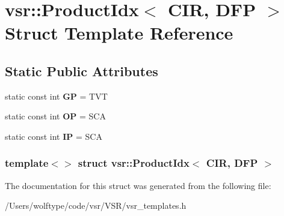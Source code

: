 \hypertarget{structvsr_1_1_product_idx_3_01_c_i_r_00_01_d_f_p_01_4}{\section{vsr\-:\-:Product\-Idx$<$ C\-I\-R, D\-F\-P $>$ Struct Template Reference}
\label{structvsr_1_1_product_idx_3_01_c_i_r_00_01_d_f_p_01_4}
}
\subsection*{Static Public Attributes}
\begin{DoxyCompactItemize}
\item 
\hypertarget{structvsr_1_1_product_idx_3_01_c_i_r_00_01_d_f_p_01_4_a2e07a5942a1a0d85abb5130ad4cd45ea}{static const int {\bfseries G\-P} = T\-V\-T}\label{structvsr_1_1_product_idx_3_01_c_i_r_00_01_d_f_p_01_4_a2e07a5942a1a0d85abb5130ad4cd45ea}

\item 
\hypertarget{structvsr_1_1_product_idx_3_01_c_i_r_00_01_d_f_p_01_4_abece641bf1c514bd27c0218af52a76ae}{static const int {\bfseries O\-P} = S\-C\-A}\label{structvsr_1_1_product_idx_3_01_c_i_r_00_01_d_f_p_01_4_abece641bf1c514bd27c0218af52a76ae}

\item 
\hypertarget{structvsr_1_1_product_idx_3_01_c_i_r_00_01_d_f_p_01_4_a8901a0a3e182dd0a49695467ba9419ef}{static const int {\bfseries I\-P} = S\-C\-A}\label{structvsr_1_1_product_idx_3_01_c_i_r_00_01_d_f_p_01_4_a8901a0a3e182dd0a49695467ba9419ef}

\end{DoxyCompactItemize}
\subsubsection*{template$<$$>$ struct vsr\-::\-Product\-Idx$<$ C\-I\-R, D\-F\-P $>$}



The documentation for this struct was generated from the following file\-:\begin{DoxyCompactItemize}
\item 
/\-Users/wolftype/code/vsr/\-V\-S\-R/vsr\-\_\-templates.\-h\end{DoxyCompactItemize}
